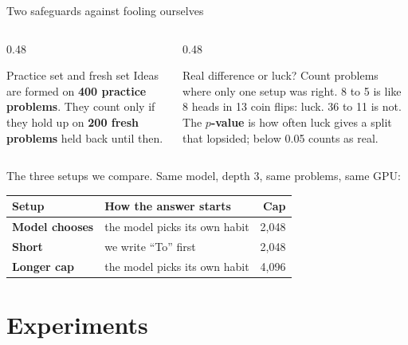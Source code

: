 \documentclass[aspectratio=169,11pt]{beamer}
\begin{document}
\begin{frame}{Two safeguards against fooling ourselves}
  \small
  \begin{columns}[T,onlytextwidth]
    \begin{column}{0.48\textwidth}
      \begin{block}{Practice set and fresh set}
        Ideas are formed on \textbf{400 practice problems}.
        They count only if they hold up on \textbf{200 fresh problems} held back until then.
      \end{block}
    \end{column}
    \begin{column}{0.48\textwidth}
      \begin{block}{Real difference or luck?}
        Count problems where only one setup was right.
        8 to 5 is like 8 heads in 13 coin flips: luck. 36 to 11 is not.
        The \textbf{$p$-value} is how often luck gives a split that lopsided; below 0.05 counts as real.
      \end{block}
    \end{column}
  \end{columns}
  \vspace{0.8em}
  The three setups we compare. Same model, depth 3, same problems, same GPU:
  \vspace{0.2em}
  \begin{center}
  \renewcommand{\arraystretch}{1.15}
  \begin{tabular}{@{}l l r@{}}
    \toprule
    \textbf{Setup} & \textbf{How the answer starts} & \textbf{Cap} \\
    \midrule
    {\color{g3}\textbf{Model chooses}} & the model picks its own habit & 2{,}048 \\
    {\color{accent}\textbf{Short}} & we write ``To'' first & 2{,}048 \\
    {\color{good}\textbf{Longer cap}} & the model picks its own habit & 4{,}096 \\
    \bottomrule
  \end{tabular}
  \end{center}
\end{frame}

\section{Experiments}
\end{document}
